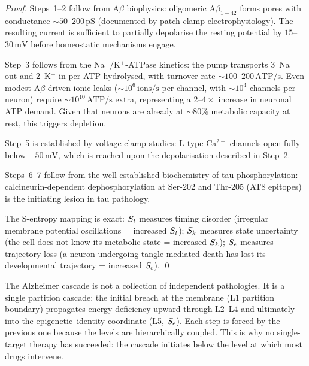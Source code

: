 \begin{proof}
Steps~1--2 follow from A$\beta$ biophysics: oligomeric A$\beta_{1-42}$ forms
pores with conductance $\sim 50\text{--}200\,\mathrm{pS}$ (documented by
patch-clamp electrophysiology). The resulting current is sufficient to
partially depolarise the resting potential by $15$--$30\,\mathrm{mV}$ before
homeostatic mechanisms engage.

Step~3 follows from the Na$^+$/K$^+$-ATPase kinetics: the pump transports
3~Na$^+$ out and 2~K$^+$ in per ATP hydrolysed, with turnover rate
$\sim 100\text{--}200\,\mathrm{ATP/s}$. Even modest A$\beta$-driven ionic
leaks ($\sim 10^6\,\mathrm{ions/s}$ per channel, with $\sim 10^4$ channels
per neuron) require $\sim 10^{10}\,\mathrm{ATP/s}$ extra, representing a
$2\text{--}4\times$ increase in neuronal ATP demand. Given that neurons are
already at $\sim 80\%$ metabolic capacity at rest, this triggers depletion.

Step~5 is established by voltage-clamp studies: L-type Ca$^{2+}$ channels
open fully below $-50\,\mathrm{mV}$, which is reached upon the depolarisation
described in Step~2.

Steps~6--7 follow from the well-established biochemistry of tau
phosphorylation: calcineurin-dependent dephosphorylation at Ser-202 and
Thr-205 (AT8 epitopes) is the initiating lesion in tau pathology.

The S-entropy mapping is exact: $S_t$ measures timing disorder (irregular
membrane potential oscillations = increased $S_t$); $S_k$ measures state
uncertainty (the cell does not know its metabolic state = increased $S_k$);
$S_e$ measures trajectory loss (a neuron undergoing tangle-mediated death
has lost its developmental trajectory = increased $S_e$). \qed
\end{proof}

\begin{remark}
The Alzheimer cascade is not a collection of independent pathologies.
It is a single partition cascade: the initial breach at the membrane
(L1 partition boundary) propagates energy-deficiency upward through L2--L4
and ultimately into the epigenetic--identity coordinate (L5, $S_e$). Each
step is forced by the previous one because the levels are hierarchically
coupled. This is why no single-target therapy has succeeded: the cascade
initiates below the level at which most drugs intervene.
\end{remark}


